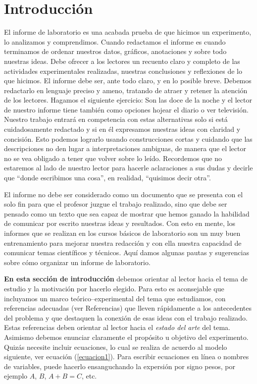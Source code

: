 \documentclass{article}
\begin{document}
\section*{Introducción}

El informe de laboratorio es una acabada prueba de que hicimos un experimento, lo analizamos y comprendimos. Cuando redactamos el informe es cuando terminamos de ordenar nuestros datos, gráficos, anotaciones y sobre todo nuestras ideas. Debe ofrecer a los lectores un recuento claro y completo de las actividades experimentales realizadas, nuestras conclusiones y reflexiones de lo que hicimos. El informe debe ser, ante todo claro, y en lo posible breve. Debemos redactarlo en lenguaje preciso y ameno, tratando de atraer y retener la atención de los lectores. Hagamos el siguiente ejercicio: Son las doce de la noche y el
lector de nuestro informe tiene también como opciones hojear el diario o ver televisión. Nuestro trabajo entrará en competencia con estas alternativas solo si está cuidadosamente redactado y si en él expresamos nuestras ideas con claridad y concisión. Esto podemos lograrlo usando construcciones cortas y cuidando que las descripciones no den lugar a interpretaciones ambiguas, de manera que el lector no se vea obligado a tener que volver sobre lo leído. Recordemos que no estaremos al lado de nuestro lector para hacerle aclaraciones a sus dudas y decirle que “donde escribimos una cosa”, en realidad, “quisimos decir otra”.

El informe no debe ser considerado como un documento que se presenta con el solo fin para que el profesor juzgue el trabajo realizado, sino que debe ser pensado como un texto que sea capaz de mostrar que hemos ganado la habilidad de comunicar por escrito nuestras ideas y resultados. Con esto en mente, los informes que se realizan en los cursos básicos de laboratorio son un muy buen entrenamiento para mejorar nuestra redacción y con ella nuestra capacidad de comunicar temas científicos y técnicos. Aquí damos algunas pautas y sugerencias sobre cómo organizar un informe de laboratorio.  

\textbf{En esta sección de introducción} debemos orientar al lector hacia el tema de estudio y la motivación por hacerlo elegido. Para esto es aconsejable que incluyamos un marco teórico–experimental del tema que estudiamos, con referencias adecuadas (ver Referencias) que lleven rápidamente a los antecedentes del problema y que destaquen la conexión de esas ideas con el trabajo realizado. Estas referencias deben orientar al lector hacia el \textit{estado del arte} del tema. Asimismo debemos enunciar claramente el propósito u objetivo del experimento. Quizás necesite incluir ecuaciones, lo cual se realiza de acuerdo al modelo siguiente, ver ecuación (\ref{ecuacion1}). Para escribir ecuaciones en línea o nombres de variables, puede hacerlo ensanguchando la expersión por signo pesos, por ejemplo $A$, $B$, $A+B=C$, etc.
\end{document}

